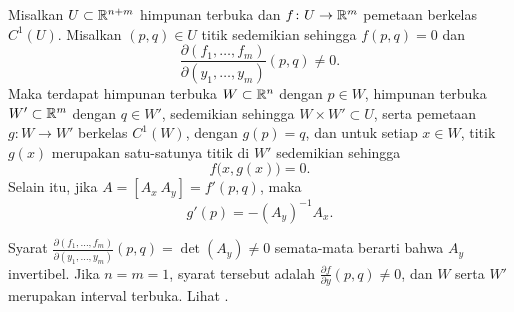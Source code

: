 \begin{thm}
\label{thm:implicit}
Misalkan $U \subset {\mathbb{R}}^{n+m}$ himpunan terbuka dan $f \colon U \to {\mathbb{R}}^m$
pemetaan berkelas $C^1(U)$.  Misalkan $(p,q) \in U$ titik sedemikian sehingga
$f(p,q) = 0$ dan
\begin{equation*}
\frac{\partial(f_1,\ldots,f_m)}{\partial(y_1,\ldots,y_m)} (p,q)  \neq 0 .
\end{equation*}
Maka terdapat
himpunan terbuka $W \subset {\mathbb{R}}^n$ dengan $p \in W$,
himpunan terbuka $W' \subset {\mathbb{R}}^m$ dengan $q \in W'$,
sedemikian sehingga $W \times W' \subset U$,
serta
pemetaan $g \colon W \to W'$ berkelas $C^1(W)$, dengan $g(p) = q$, dan
untuk setiap $x \in W$, titik $g(x)$ merupakan satu-satunya titik di $W'$
sedemikian sehingga 
\begin{equation*}
f\bigl(x,g(x)\bigr) = 0 .
\end{equation*}
Selain itu, jika $A = [ A_x ~ A_y ] = f'(p,q)$, maka
\begin{equation*}
g'(p) = -{(A_y)}^{-1}A_x .
\end{equation*}
\end{thm}

Syarat
$\frac{\partial(f_1,\ldots,f_m)}{\partial(y_1,\ldots,y_m)} (p,q) =
\det(A_y)  \neq 0$
semata-mata berarti bahwa $A_y$ invertibel.  Jika $n=m=1$, syarat tersebut 
adalah $\frac{\partial f}{\partial y}(p,q) \neq 0$, dan $W$ serta $W'$ merupakan 
interval terbuka.  Lihat .
\begin{myfigureht}
\caption{Teorema fungsi implisit untuk $f(x,y) = x^2+y^2-1$ pada $U=\R^2$ dan
$(p,q)$ di kuadran pertama.\label{fig:implicitfunc}}
\end{myfigureht}

